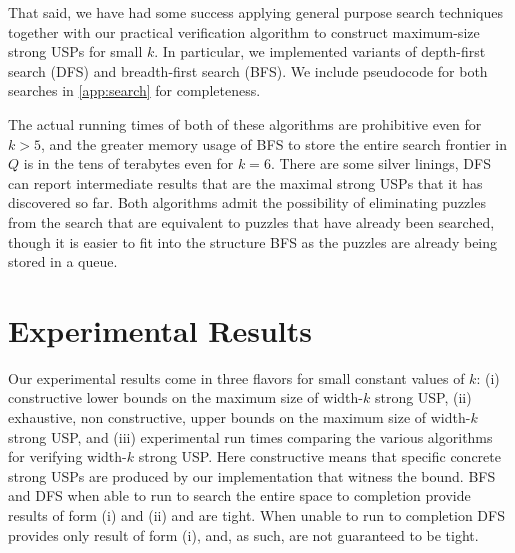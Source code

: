 \documentclass[11pt]{article}
\begin{document}
That said, we have had some success applying general purpose search
techniques together with our practical verification algorithm to
construct maximum-size strong USPs for small $k$.  In particular, we
implemented variants of depth-first search (DFS) and breadth-first
search (BFS).  We include pseudocode for both searches in
\autoref{app:search} for completeness.

The actual running times of both of these algorithms are prohibitive
even for $k > 5$, and the greater memory usage of \textsc{BFS} to
store the entire search frontier in $Q$ is in the tens of terabytes
even for $k = 6$.  There are some silver linings, \textsc{DFS} can
report intermediate results that are the maximal strong USPs that it
has discovered so far.  Both algorithms admit the possibility of
eliminating puzzles from the search that are equivalent to puzzles
that have already been searched, though it is easier to fit into the
structure \textsc{BFS} as the puzzles are already being stored in a
queue.

\begin{comment}
  Not planning to discuss:
  \begin{itemize}
  \item A$^*$ + admissible heuristics.
  \item Upper bounds from A$^*$.
  \item Symmetry removal.
  \end{itemize}
\end{comment}

\section{Experimental Results}
\label{sec:results}

Our experimental results come in three flavors for small constant
values of $k$: (i) constructive lower bounds on the maximum size of
width-$k$ strong USP, (ii) exhaustive, non constructive, upper bounds
on the maximum size of width-$k$ strong USP, and (iii) experimental
run times comparing the various algorithms for verifying width-$k$
strong USP.  Here constructive means that specific concrete strong
USPs are produced by our implementation that witness the bound.
\textsc{BFS} and \textsc{DFS} when able to run to search the entire
space to completion provide results of form (i) and (ii) and are
tight.  When unable to run to completion \textsc{DFS} provides only
result of form (i), and, as such, are not guaranteed to be tight.
\end{document}
